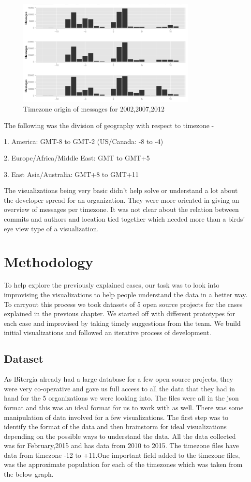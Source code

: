 \documentclass[double,12pt]{beavtex}
\begin{document}
\begin{figure}[!ht]
\centering
\includegraphics[width=90mm]{work2.png}
\caption{Timezone origin of messages for 2002,2007,2012}
\end{figure}

The following was the division of geography with respect to timezone -

1. America: GMT-8 to GMT-2 (US/Canada: -8 to -4)

2. Europe/Africa/Middle East: GMT to GMT+5

3. East Asia/Australia: GMT+8 to GMT+11


The visualizations being very basic didn't help solve or understand a lot about the developer spread for an organization. They were more oriented in giving an overview of messages per timezone. It was not clear about the relation between commits and authors and location tied together which needed more than a birds' eye view type of a visualization. 


\chapter{Methodology}
To help explore the previously explained cases, our task was to look into improvising the visualizations to help people understand the data in a better way. To carryout this process we took datasets of 5 open source projects for the cases explained in the previous chapter. We started off with different prototypes for each case and improvised by taking timely suggestions from the team. We build initial visualizations and followed an iterative process of development.

\section{Dataset}
As Bitergia already had a large database for a few open source projects, they were very co-operative and gave us full access to all the data that they had in hand for the 5 organizations we were looking into. The files were all in the json format and this was an ideal format for us to work with as well. There was some manipulation of data involved for a few visualizations. The first step was to identify the format of the data and then brainstorm for ideal visualizations depending on the possible ways to understand the data. All the data collected was for February,2015 and has data from 2010 to 2015. The timezone files have data from timezone -12 to +11.One important field added to the timezone files, was the approximate population for each of the timezones which was taken from the below graph.
\end{document}

